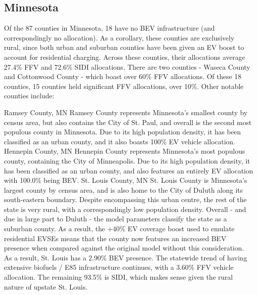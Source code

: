 \documentclass[answers]{exam}
\begin{document}
\subsection{Minnesota}
Of the 87 counties in Minnesota, 18 have no BEV infrastructure (and correspondingly no allocation). As a corollary, these counties are exclusively rural, since both urban and suburban counties have been given an EV boost to account for residential charging. Across these counties, their allocations average 27.4\% FFV and 72.6\% SIDI allocations. There are two counties - Waseca County and Cottonwood County - which boast over 60\% FFV allocations. Of these 18 counties, 15 counties held significant FFV allocations, over 10\%. Other notable counties include:
\begin{outline}
\1 Ramsey County, MN
\2 Ramsey County represents Minnesota's smallest county by census area, but also contains the City of St. Paul, and overall is the second most populous county in Minnesota. Due to its high population density, it has been classified as an urban county, and it also boasts 100\% EV vehicle allocation. 
\1 Hennepin County, MN
\2 Hennepin County represents Minnesota's most populous county, containing the City of Minneapolis. Due to its high population density, it has been classified as an urban county, and also features an entirely EV allocation with 100.0\% being BEV.  
\1 St. Louis County, MN
\2 St. Louis County is Minnesota's largest county by census area, and is also home to the City of Duluth along its south-eastern boundary. Despite encompassing this urban centre, the rest of the state is very rural, with a correspondingly low population density. Overall - and due in large part to Duluth - the model parameters classify the state as a suburban county. As a result, the +40\% EV coverage boost used to emulate residential EVSEs means that the county now features an increased BEV presence when compared against the original model without this consideration. As a result, St. Louis has a 2.90\% BEV presence. The statewide trend of having extensive biofuels / E85 infrastructure continues, with a 3.60\% FFV vehicle allocation. The remaining 93.5\% is SIDI, which makes sense given the rural nature of upstate St. Louis.
\end{outline}
\end{document}
